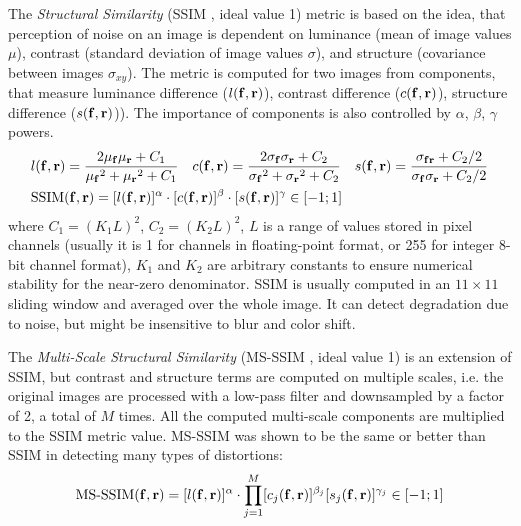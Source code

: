 The \textit{Structural Similarity} (SSIM \cite{metric:ssim04}, ideal value 1) metric is based on the idea, that perception of noise on an image is dependent on luminance (mean of image values $\mu$), contrast (standard deviation of image values $\sigma$), and structure (covariance between images $\sigma_{xy}$). The metric is computed for two images from components, that measure luminance difference ($l(\bm{\mathrm{f}}, \bm{\mathrm{r}})$), contrast difference ($c(\bm{\mathrm{f}}, \bm{\mathrm{r}})$), structure difference ($s(\bm{\mathrm{f}}, \bm{\mathrm{r}})$)). The importance of components is also controlled by $\alpha$, $\beta$, $\gamma$ powers.
\begin{equation}
	\setlength\abovedisplayskip{6pt} 
	\begin{aligned}
	& l(\bmr{f}, \bmr{r}) = \frac{2 \mu_{\bmr{f}} \mu_{\bmr{r}} + C_1}{{\mu_{\bmr{f}}}^2 + {\mu_{\bmr{r}}}^2 + C_1} \quad
	c(\bmr{f}, \bmr{r}) = \frac{2 \sigma_{\bmr{f}} \sigma_{\bmr{r}}+ C_2}{{\sigma_{\bmr{f}}}^2 + {\sigma_{\bmr{r}}}^2 + C_2} \quad
	s(\bmr{f}, \bmr{r}) = \frac{\sigma_{\bmr{f}\bmr{r}} + C_2/2}{\sigma_{\bmr{f}}\sigma_{\bmr{r}} + C_2/2} \\
	& \text{SSIM}(\bmr{f}, \bmr{r}) = 
	[l(\bmr{f}, \bmr{r})]^\alpha \cdot
	[c(\bmr{f}, \bmr{r})]^\beta \cdot
	[s(\bmr{f}, \bmr{r})]^\gamma \in [-1;1]
	\end{aligned}
	\setlength\belowdisplayskip{6pt}
\end{equation}
where $C_1 = (K_1L)^2$, $C_2 = (K_2L)^2$,  $L$ is a range of values stored in pixel channels (usually it is 1 for channels in floating-point format, or 255 for integer 8-bit channel format), $K_1$ and $K_2$ are arbitrary constants to ensure numerical stability for the near-zero denominator. SSIM is usually computed in an $11 \times 11$ sliding window and averaged over the whole image. It can detect degradation due to noise, but might be insensitive to blur and color shift.

The \textit{Multi-Scale Structural Similarity} (MS-SSIM \cite{metric:msssim03}, ideal value 1) is an extension of SSIM, but contrast and structure terms are computed on multiple scales, i.e. the original images are processed with a low-pass filter and downsampled by a factor of 2, a total of $M$ times. All the computed multi-scale components are multiplied to the SSIM metric value. MS-SSIM was shown to be the same or better than SSIM in detecting many types of distortions:
\begin{equation}
	\setlength\abovedisplayskip{0pt} 
	\text{MS-SSIM}(\bmr{f}, \bmr{r}) = 
	[l(\bmr{f}, \bmr{r})]^\alpha \cdot
	\prod_{j=1}^{M}
	[c_j(\bmr{f}, \bmr{r})]^{\beta_{j}}
	[s_j(\bmr{f}, \bmr{r})]^{\gamma_j} \in [-1;1] \setlength\belowdisplayskip{0pt} 
\end{equation}

